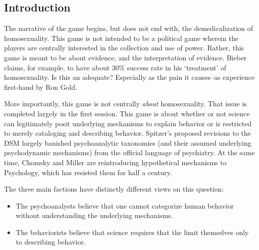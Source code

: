  \begin{refsection}
\maketitle
\newpage
\tableofcontents
\newpage
\listoftables
\newpage
\listoffigures
\newpage

\renewcommand*{\thechapter}{\arabic{chapter}}
\renewcommand*{\thesection}{\arabic{section}}

\setcounter{chapter}{0}
\mainmatter

\pagebreak 

\chapter{Introduction}
\label{introduction}

The narrative of the game begins, but does not end with, the demedicalization of homosexuality. This game is not intended to be a political game wherein the players are centrally interested in the collection and use of power. Rather, this game is meant to be about evidence, and the interpretation of evidence. Bieber claims, for example, to have about 30\% success rate in his `treatment' of homosexuality. Is this an adequate? Especially as the pain it causes--as experience first-hand by Ron Gold.

More importantly, this game is not centrally \emph{about} homosexuality. That issue is completed largely in the first session. This game is about whether or not science can legitimately posit underlying mechanisms to explain behavior or is restricted to merely cataloging and describing behavior. Spitzer's proposed revisions to the DSM largely banished psychoanalytic taxonomies (and their assumed underlying psychodynamic mechanisms) from the official language of psychiatry. At the same time, Chomsky and Miller are reintroducing hypothetical mechanisms to Psychology, which has resisted them for half a century.

The three main factions have distinctly different views on this question: 

\begin{itemize}
\item The psychoanalysts believe that one cannot categorize human behavior without understanding the underlying mechanisms. 

\item The behaviorists believe that science requires that the limit themselves only to describing behavior. 


\end{itemize}
\end{refsection}
